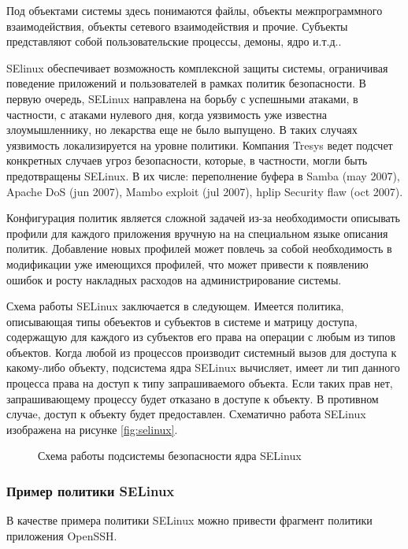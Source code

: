 Под объектами системы здесь 
понимаются файлы, объекты межпрограммного 
взаимодействия, объекты сетевого взаимодействия 
и прочие. Субъекты представляют собой 
пользовательские процессы, демоны, ядро и.т.д..

SElinux обеспечивает возможность 
комплексной защиты системы, ограничивая поведение 
приложений и пользователей в рамках политик 
безопасности. В первую очередь, SELinux 
направлена на борьбу с успешными атаками, 
в частности, с атаками нулевого дня, когда 
уязвимость уже известна злоумышленнику, 
но лекарства еще не было выпущено. В таких 
случаях уязвимость локализируется на уровне 
политики. Компания Tresys ведет подсчет 
конкретных случаев угроз безопасности, которые, 
в частности, могли быть предотвращены SELinux. 
В их числе: переполнение буфера в Samba (may 
2007), Apache DoS (jun 2007), Mambo exploit (jul 
2007), hplip Security flaw (oct 2007). 

Конфигурация политик является 
сложной задачей из-за необходимости
описывать профили для каждого приложения 
вручную на на специальном языке описания
политик. Добавление новых профилей может повлечь 
за собой необходимость в модификации уже имеющихся 
профилей, что может привести к появлению 
ошибок и росту накладных расходов на 
администрирование системы.  

Схема работы SELinux заключается в следующем.
Имеется политика, описывающая типы обеъектов
и субъектов в системе и матрицу доступа,
содержащую для каждого из субъектов его права
на операции с любым из типов объектов. Когда
любой из процессов производит системный вызов
для доступа к какому-либо объекту, подсистема
ядра SELinux вычисляет, имеет ли тип данного процесса
права на доступ к типу запрашиваемого объекта.
Если таких прав нет, запрашивающему процессу
будет отказано в доступе к объекту. В противном
случаe, доступ к объекту будет предоставлен.
Схематично работа SELinux изображена на рисунке
\ref{fig:selinux}.

\begin{figure}
\centering
\subfloat{\label{fig:selinux}{}}
\caption{Схема работы подсистемы безопасности ядра SELinux}
\end{figure}

\subsubsection{Пример политики SELinux}

В качестве примера политики SELinux можно привести
фрагмент политики приложения OpenSSH.

